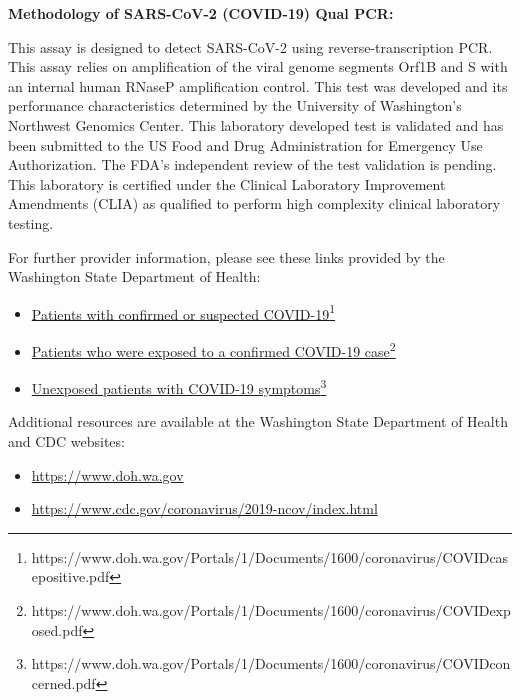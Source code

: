 \documentclass[10pt]{article}
\newcommand{\link}[2]{\href{#1}{#2}\footnote{#1}}
\begin{document}
\bigskip
\textbf{Methodology of SARS-CoV-2 (COVID-19) Qual PCR:}

This assay is designed to detect SARS-CoV-2 using reverse-transcription
PCR.  This assay relies on amplification of the viral genome segments
Orf1B and S with an internal human RNaseP amplification control.  This
test was developed and its performance characteristics determined by the
University of Washington's Northwest Genomics Center.  This laboratory
developed test is validated and has been submitted to the US Food and
Drug Administration for Emergency Use Authorization. The FDA's
independent review of the test validation is pending. This laboratory is
certified under the Clinical Laboratory Improvement Amendments (CLIA) as
qualified to perform high complexity clinical laboratory testing.

For further provider information, please see these links provided by the
Washington State Department of Health:

\begin{itemize}
\item

  \link{https://www.doh.wa.gov/Portals/1/Documents/1600/coronavirus/COVIDcasepositive.pdf}{Patients with confirmed or suspected COVID-19}

\item

  \link{https://www.doh.wa.gov/Portals/1/Documents/1600/coronavirus/COVIDexposed.pdf}{Patients
  who were exposed to a confirmed COVID-19 case}

\item

  \link{https://www.doh.wa.gov/Portals/1/Documents/1600/coronavirus/COVIDconcerned.pdf}{Unexposed
  patients with COVID-19 symptoms}

\end{itemize}

Additional resources are available at the Washington State Department of Health
and CDC websites:

\begin{itemize}
\item

  \url{https://www.doh.wa.gov}

\item

  \url{https://www.cdc.gov/coronavirus/2019-ncov/index.html}

\end{itemize}
\end{document}
